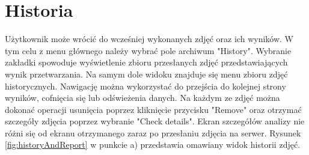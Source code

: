 \section{Historia}{
Użytkownik może wrócić do wcześniej wykonanych zdjęć oraz ich wyników. W tym celu z menu głównego należy wybrać pole archiwum "History". Wybranie zakładki spowoduje wyświetlenie zbioru przesłanych zdjęć przedstawiających wynik przetwarzania. Na samym dole widoku znajduje się menu zbioru zdjęć historycznych. Nawigację można wykorzystać do przejścia do kolejnej strony wyników, cofnięcia się lub odświeżenia danych. Na każdym ze zdjęć można dokonać operacji usunięcia poprzez kliknięcie przycisku "Remove" oraz otrzymać szczegóły zdjęcia poprzez wybranie "Check details". Ekran szczegółów analizy nie różni się od ekranu otrzymanego zaraz po przesłaniu zdjęcia na serwer. Rysunek \ref{fig:historyAndReport} w punkcie a) przedstawia omawiany widok historii zdjęć.
}
